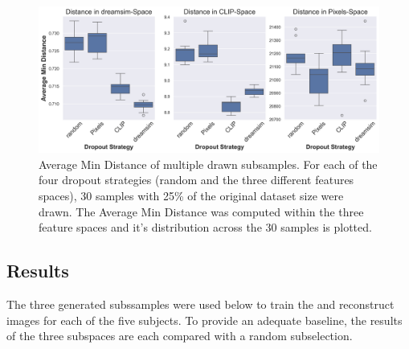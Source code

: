 \begin{figure}[ht]
    \centering
    \includegraphics[width=1\textwidth]{plots/dropout_avg_min_distance.png}
    \caption[Average Min Distance with different dropout strategies]{Average Min Distance of multiple drawn subsamples. For each of the four dropout strategies (random and the three different features spaces), 30 samples with 25\% of the original dataset size were drawn. The Average Min Distance was computed within the three feature spaces and it's distribution across the 30 samples is plotted.}\label{fig:dropout_avg_min_distance}
\end{figure}


\subsection{Results}
The three generated subssamples were used below to train the  and reconstruct images for each of the five subjects. To provide an adequate baseline, the results of the three subspaces are each compared with a random subselection. 

